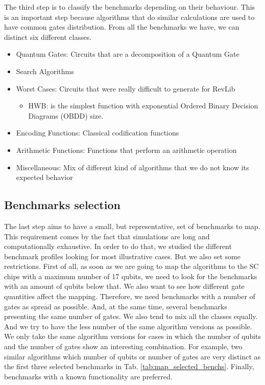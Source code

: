 The third step is to classify the benchmarks depending on their behaviour.
This is an important step because algorithms that do similar calculations are used to have common gates distribution.
From all the benchmarks we have, we can distinct six different classes.

\begin{itemize}
\item Quantum Gates: Circuits that are a decomposition of a Quantum Gate
\item Search Algorithms
\item Worst Cases: Circuits that were really difficult to generate for RevLib
\begin{itemize}
\item HWB: is the simplest function with exponential Ordered Binary Decision Diagrams (OBDD) size.
\end{itemize}
\item Encoding Functions: Classical codification functions
\item Arithmetic Functions: Functions that perform an arithmetic operation
\item Miscellaneous: Mix of different kind of algorithms that we do not know its expected behavior
\end{itemize}


\subsection*{Benchmarks selection}
\label{sec:orgf8d91d7}

The last step aims to have a small, but representative, set of benchmarks to map.
This requirement comes by the fact that simulations are long and computationally exhaustive.
In order to do that, we studied the different benchmark profiles looking for most illustrative cases.
But we also set some restrictions.
First of all, as soon as we are going to map the algorithms to the SC chips with a maximum number of 17 qubits, we need to look for the benchmarks with an amount of qubits below that.
We also want to see how different gate quantities affect the mapping.
Therefore, we need benchmarks with a number of gates as spread as possible.
And, at the same time, several benchmarks presenting the same number of gates.
We also tend to mix all the classes equally.
And we try to have the less number of the same algorithm versions as possible.
We only take the same algorithm versions for cases in which the number of qubits and the number of gates show an interesting combination.
For example, two similar algorithms which number of qubits or number of gates are very distinct as the first three selected benchmarks in Tab. \ref{tab:map_selected_benchs}.
Finally, benchmarks with a known functionality are preferred.

